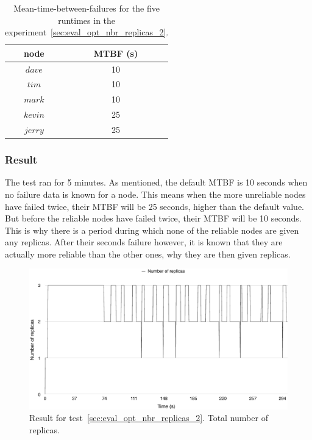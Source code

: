 \documentclass{cslthse-msc}
\begin{document}
\begin{table}[h]
	\begin{center}
	\begin{tabular}{| c | c |}
	 \hline
	 node & MTBF (s) \\
	 \hline		
	  $dave$ & 10 \\
	  $tim$ & 10 \\
	  $mark$ & 10 \\
	  $kevin$ & 25 \\
	  $jerry$ & 25 \\
	   \hline
	\end{tabular}
	 \caption{Mean-time-between-failures for the five runtimes in the experiment~\ref{sec:eval_opt_nbr_replicas_2}.}
	 \label{table:exp_nodes_means_2}
	 \end{center}
 \end{table}


\subsubsection*{Result}
The test ran for 5 minutes. As mentioned, the default MTBF is 10 seconds when no failure data is known for a node. This means when the more unreliable nodes have failed twice, their MTBF will be 25 seconds, higher than the default value. But before the reliable nodes have failed twice, their MTBF will be 10 seconds. This is why there is a period during which none of the reliable nodes are given any replicas. After their seconds failure however, it is known that they are actually more reliable than the other ones, why they are then given replicas.

\begin{figure}[!hbt]
\centering
\includegraphics[scale=0.5]{images/results/optimal_replicas/2/total.pdf}
\caption{Result for test~\ref{sec:eval_opt_nbr_replicas_2}. Total number of replicas.} \label{fig:exp_opt_replicas_total_2}
\end{figure}
\end{document}
